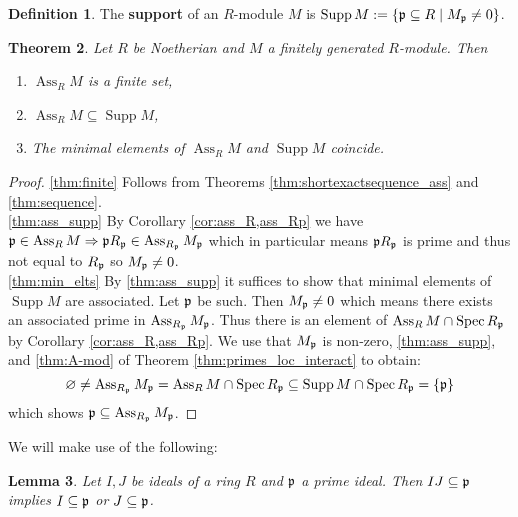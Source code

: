 \documentclass[12pt]{article}
\theoremstyle{plain}
\newtheorem{thm}{Theorem}[subsection] %
\newtheorem{lemma}[thm]{Lemma}
\theoremstyle{definition}
\newtheorem{defn}[thm]{Definition} %
\begin{document}
\begin{defn}
The \textbf{support} of an $R$-module $M$ is $\operatorname{Supp}M := \lbrace \frak{p} \subseteq R \mid M_\frak{p} \neq 0\rbrace$.
\end{defn}
\begin{thm}
\label{thm:fin_sub_min}
Let $R$ be Noetherian and $M$ a finitely generated $R$-module. Then
\begin{enumerate}
    \item\label{thm:finite} $\operatorname{Ass}_RM$ is a finite set,
    \item\label{thm:ass_supp} $\operatorname{Ass}_RM \subseteq \operatorname{Supp}M$,
    \item\label{thm:min_elts} The minimal elements of $\operatorname{Ass}_RM$ and $\operatorname{Supp}M$ coincide.
\end{enumerate}
\end{thm}
\begin{proof}
\eqref{thm:finite} Follows from Theorems \ref{thm:shortexactsequence_ass} and \ref{thm:sequence}.\\
%
\eqref{thm:ass_supp} By Corollary \ref{cor:ass_R,ass_Rp} we have $\frak{p} \in \operatorname{Ass}_RM \Rightarrow \frak{p}R_{\frak{p}} \in \operatorname{Ass}_{R_\frak{p}}M_{\frak{p}}$ which in particular means $\frak{p}R_{\frak{p}}$ is prime and thus not equal to $R_\frak{p}$ so $M_\frak{p} \neq 0$.\\
%
\eqref{thm:min_elts} By \eqref{thm:ass_supp} it suffices to show that minimal elements of $\operatorname{Supp}M$ are associated. Let $\frak{p}$ be such. Then $M_\frak{p} \neq 0$ which means there exists an associated prime in $\operatorname{Ass}_{R_\frak{p}}M_\frak{p}$. Thus there is an element of $\operatorname{Ass}_RM \cap \operatorname{Spec}R_\frak{p}$ by Corollary \ref{cor:ass_R,ass_Rp}. We use that $M_\frak{p}$ is non-zero, \eqref{thm:ass_supp}, and \eqref{thm:A-mod} of Theorem \ref{thm:primes_loc_interact} to obtain:
\[\varnothing \neq \operatorname{Ass}_{R_\frak{p}}M_\frak{p} = \operatorname{Ass}_RM \cap \operatorname{Spec}R_{\frak{p}} \subseteq \operatorname{Supp}M \cap \operatorname{Spec}R_{\frak{p}} = \lbrace \frak{p} \rbrace\]
which shows $\frak{p} \subseteq \operatorname{Ass}_{R_\frak{p}}M_\frak{p}$.
\end{proof}
We will make use of the following:
\begin{lemma}
\label{lem:product}
Let $I,J$ be ideals of a ring $R$ and $\frak{p}$ a prime ideal. Then $IJ \subseteq \frak{p}$ implies $I \subseteq \frak{p}$ or $J \subseteq \frak{p}$.
\end{lemma}
\end{document}
